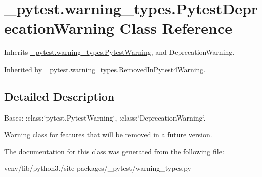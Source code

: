 \hypertarget{class__pytest_1_1warning__types_1_1_pytest_deprecation_warning}{}\section{\+\_\+pytest.\+warning\+\_\+types.\+Pytest\+Deprecation\+Warning Class Reference}
\label{class__pytest_1_1warning__types_1_1_pytest_deprecation_warning}


Inherits \hyperlink{class__pytest_1_1warning__types_1_1_pytest_warning}{\+\_\+pytest.\+warning\+\_\+types.\+Pytest\+Warning}, and Deprecation\+Warning.



Inherited by \hyperlink{class__pytest_1_1warning__types_1_1_removed_in_pytest4_warning}{\+\_\+pytest.\+warning\+\_\+types.\+Removed\+In\+Pytest4\+Warning}.



\subsection{Detailed Description}
\begin{DoxyVerb}Bases: :class:`pytest.PytestWarning`, :class:`DeprecationWarning`.

Warning class for features that will be removed in a future version.
\end{DoxyVerb}
 

The documentation for this class was generated from the following file\+:\begin{DoxyCompactItemize}
\item 
venv/lib/python3./site-\/packages/\+\_\+pytest/warning\+\_\+types.\+py\end{DoxyCompactItemize}
